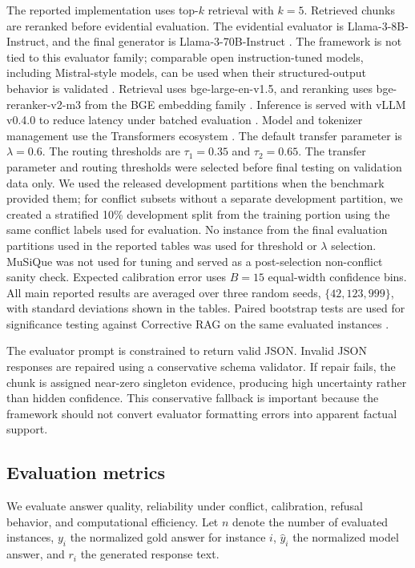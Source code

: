 \documentclass[preprint,12pt,authoryear,nopreprintline]{elsarticle}
\begin{document}
The reported implementation uses top-$k$ retrieval with $k=5$. Retrieved chunks are reranked before evidential evaluation. The evidential evaluator is Llama-3-8B-Instruct, and the final generator is Llama-3-70B-Instruct \citep{Grattafiori2024Llama3}. The framework is not tied to this evaluator family; comparable open instruction-tuned models, including Mistral-style models, can be used when their structured-output behavior is validated \citep{Jiang2023Mistral7B}. Retrieval uses bge-large-en-v1.5, and reranking uses bge-reranker-v2-m3 from the BGE embedding family \citep{Chen2024BGEM3}. Inference is served with vLLM v0.4.0 to reduce latency under batched evaluation \citep{Kwon2023vLLM}. Model and tokenizer management use the Transformers ecosystem \citep{Wolf2020Transformers}. The default transfer parameter is $\lambda=0.6$. The routing thresholds are $\tau_1=0.35$ and $\tau_2=0.65$. The transfer parameter and routing thresholds were selected before final testing on validation data only. We used the released development partitions when the benchmark provided them; for conflict subsets without a separate development partition, we created a stratified 10\% development split from the training portion using the same conflict labels used for evaluation. No instance from the final evaluation partitions used in the reported tables was used for threshold or $\lambda$ selection. MuSiQue was not used for tuning and served as a post-selection non-conflict sanity check. Expected calibration error uses $B=15$ equal-width confidence bins. All main reported results are averaged over three random seeds, $\{42,123,999\}$, with standard deviations shown in the tables. Paired bootstrap tests are used for significance testing against Corrective RAG on the same evaluated instances \citep{Efron1979Bootstrap}.

The evaluator prompt is constrained to return valid JSON. Invalid JSON responses are repaired using a conservative schema validator. If repair fails, the chunk is assigned near-zero singleton evidence, producing high uncertainty rather than hidden confidence. This conservative fallback is important because the framework should not convert evaluator formatting errors into apparent factual support.


\subsection{Evaluation metrics}
\label{sec:evaluation_metrics}

We evaluate answer quality, reliability under conflict, calibration, refusal behavior, and computational efficiency. Let $n$ denote the number of evaluated instances, $y_i$ the normalized gold answer for instance $i$, $\hat{y}_i$ the normalized model answer, and $r_i$ the generated response text.
\end{document}
